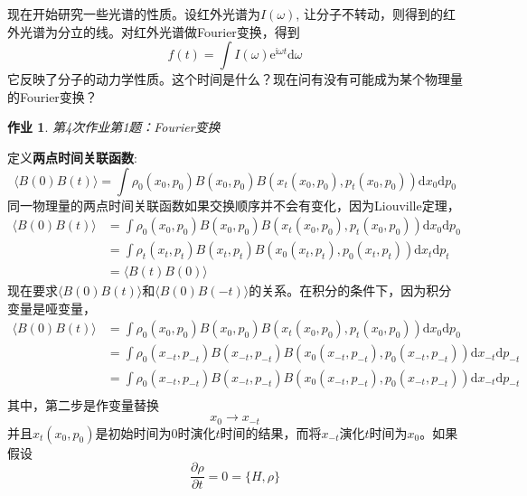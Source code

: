 \documentclass[12pt]{article}
\newtheorem{asg}{作业}
\begin{document}
    现在开始研究一些光谱的性质。设红外光谱为$I(\omega)$, 让分子不转动，则得到的红外光谱为分立的线。对红外光谱做Fourier变换，得到
    \begin{equation}
    f(t) = \int I(\omega)\mathrm{e}^{\mathrm{i}\omega t}\mathrm{d}\omega 
    \end{equation}
    它反映了分子的动力学性质。这个时间是什么？现在问有没有可能成为某个物理量的Fourier变换？
    \begin{asg}
        第4次作业第1题：Fourier变换
    \end{asg}
    定义\textbf{两点时间关联函数}:
    \begin{equation}
    \langle B(0)B(t) \rangle = \int \rho_0(x_0,p_0) B(x_0,p_0) B(x_t(x_0,p_0),p_t(x_0,p_0)) \mathrm{d}x_0 \mathrm{d}p_0
    \end{equation}
    同一物理量的两点时间关联函数如果交换顺序并不会有变化，因为Liouville定理，
    \begin{equation}\begin{aligned}
    \langle B(0)B(t) \rangle &= \int \rho_0(x_0,p_0) B(x_0,p_0) B(x_t(x_0,p_0),p_t(x_0,p_0)) \mathrm{d}x_0 \mathrm{d}p_0\\
    &= \int \rho_t(x_t,p_t) B(x_t,p_t) B(x_0(x_t,p_t),p_0(x_t,p_t)) \mathrm{d}x_t \mathrm{d}p_t\\
    &= \langle B(t)B(0) \rangle
    \end{aligned}\end{equation}
    现在要求$\langle B(0)B(t) \rangle$和$\langle B(0)B(-t) \rangle$的关系。在积分的条件下，因为积分变量是哑变量，
    \begin{equation}\begin{aligned}
    \langle B(0)B(t) \rangle &= \int \rho_0(x_0,p_0) B(x_0,p_0) B(x_t(x_0,p_0),p_t(x_0,p_0)) \mathrm{d}x_0 \mathrm{d}p_0\\
    &= \int \rho_0(x_{-t},p_{-t}) B(x_{-t},p_{-t}) B(x_0(x_{-t},p_{-t}),p_0(x_{-t},p_{-t})) \mathrm{d}x_{-t} \mathrm{d}p_{-t}\\
    &= \int \rho_0(x_{-t},p_{-t}) B(x_{-t},p_{-t}) B(x_0(x_{-t},p_{-t}),p_0(x_{-t},p_{-t})) \mathrm{d}x_{-t} \mathrm{d}p_{-t}\\
    \end{aligned}\end{equation}
    其中，第二步是作变量替换
    \begin{equation}
    x_0 \to x_{-t}
    \end{equation}
    并且$x_t(x_0,p_0)$是初始时间为0时演化$t$时间的结果，而将$x_{-t}$演化$t$时间为$x_0$。如果假设
    \begin{equation}
    \frac {\partial \rho}{\partial t} = 0 = \{ H, \rho\}
    \end{equation}
\end{document}
